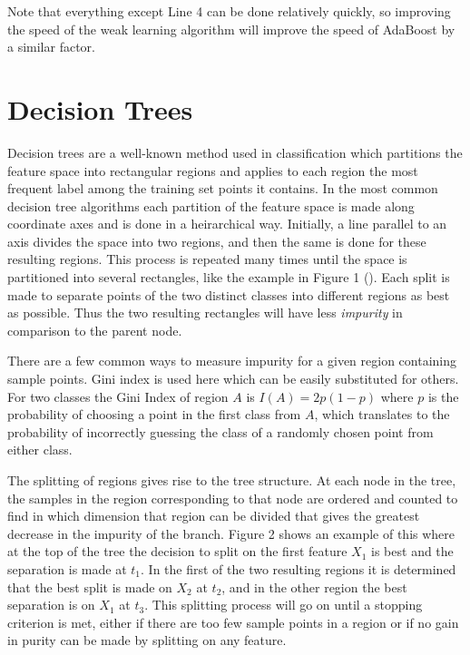 \documentclass[12pt]{article}
\begin{document}
Note that everything except Line 4 can be done relatively quickly, so improving
the speed of the weak learning algorithm will improve the speed of AdaBoost by
a similar factor. 

\section{Decision Trees}

\indent Decision trees are a well-known method used in classification which
partitions the feature space into rectangular regions and applies to each
region the most frequent label among the training set points it contains. In
the most common decision tree algorithms each partition of the feature space is
made along coordinate axes and is done in a heirarchical way. Initially, a line
parallel to an axis divides the space into two regions, and then the same is
done for these resulting regions. This process is repeated many times until the
space is partitioned into several rectangles, like the example in Figure 1
(\cite{HTF}). Each split is made to separate points of the two distinct classes
into different regions as best as possible. Thus the two resulting rectangles
will have less {\it impurity} in comparison to the parent node.


There are a few common ways to measure impurity for a given region containing
sample points. Gini index is used here which can be easily substituted for
others. For two classes the Gini Index of region $A$ is $I(A) = 2p(1-p)$ where
$p$ is the probability of choosing a point in the first class from $A$, which
translates to the probability of incorrectly guessing the class of a randomly
chosen point from either class.

The splitting of regions gives rise to the tree structure. At each node in the
tree, the samples in the region corresponding to that node are ordered and
counted to find in which dimension that region can be divided that gives the
greatest decrease in the impurity of the branch. Figure 2 shows an example of
this where at the top of the tree the decision to split on the first feature
$X_1$ is best and the separation is made at $t_1$. In the first of the two
resulting regions it is determined that the best split is made on $X_2$ at
$t_2$, and in the other region the best separation is on $X_1$ at $t_3$. This
splitting process will go on until a stopping criterion is met, either if there
are too few sample points in a region or if no gain in purity can be made by
splitting on any feature.
\end{document}
